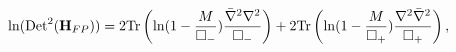 \begin{equation}\label{fpresult}
\ln ({\rm Det}^2({\bf H}_{FP}))= 2{\rm Tr}\left(\ln (1-{M\over \Box_{-}}){\bar{\nabla}^{2}\nabla^{2}\over
\Box_{-}}\right)
 + 2{\rm Tr}\left(\ln(1-{M\over \Box_{+}}){\nabla^{2}\bar{\nabla}^{2}\over \Box_{+}}\right),
\end{equation}

